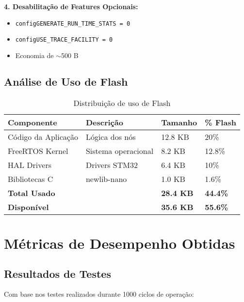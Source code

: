 \documentclass[12pt,a4paper]{article}
\begin{document}
\textbf{4. Desabilitação de Features Opcionais:}
\begin{itemize}
    \item \texttt{configGENERATE\_RUN\_TIME\_STATS = 0}
    \item \texttt{configUSE\_TRACE\_FACILITY = 0}
    \item Economia de $\sim$500 B
\end{itemize}

\subsection{Análise de Uso de Flash}

\begin{table}[H]
\centering
\begin{tabularx}{\textwidth}{lXll}
\toprule
\textbf{Componente} & \textbf{Descrição} & \textbf{Tamanho} & \textbf{\% Flash} \\
\midrule
Código da Aplicação & Lógica dos nós & 12.8 KB & 20\% \\
FreeRTOS Kernel & Sistema operacional & 8.2 KB & 12.8\% \\
HAL Drivers & Drivers STM32 & 6.4 KB & 10\% \\
Bibliotecas C & newlib-nano & 1.0 KB & 1.6\% \\
\midrule
\textbf{Total Usado} & & \textbf{28.4 KB} & \textbf{44.4\%} \\
\textbf{Disponível} & & \textbf{35.6 KB} & \textbf{55.6\%} \\
\bottomrule
\end{tabularx}
\caption{Distribuição de uso de Flash}
\end{table}

\section{Métricas de Desempenho Obtidas}

\subsection{Resultados de Testes}

Com base nos testes realizados durante 1000 ciclos de operação:
\end{document}
